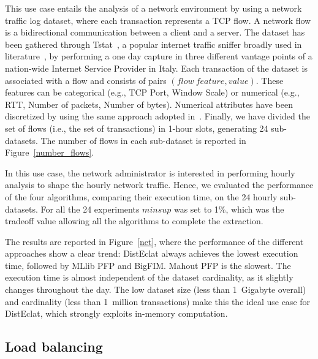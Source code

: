 This use case entails the analysis of a network environment by
using a network traffic log dataset, where each transaction represents a TCP flow.
A network flow is a bidirectional communication between a client and a server.
The dataset has been gathered through Tstat~\cite{Tstat,Tstat2}, a popular
internet traffic sniffer broadly used in
literature~\cite{giordano2015youlighter,ApilettiBCCG13},
by performing a one day capture in three different vantage points
of a nation-wide Internet Service Provider in Italy.
Each transaction of the dataset is associated with
a flow and consists of pairs $(flow~feature, value)$. These features can be
categorical (e.g., TCP Port, Window Scale) or numerical (e.g., RTT,
Number of packets, Number of bytes). Numerical attributes have been discretized by using the same
approach adopted in~\cite{ApilettiBCCG13}.
Finally, we have divided the set of flows (i.e., the set of transactions)
in 1-hour slots, generating 24 sub-datasets.
The number of flows in each sub-dataset
is reported in Figure~\ref{number_flows}.

In this use case, the network administrator is interested in performing hourly
analysis to shape the hourly network traffic.
Hence, we evaluated the performance of the four algorithms,
comparing their execution time, on the 24 hourly sub-datasets.
For all the 24 experiments $minsup$ was set to 1\%, which was
the tradeoff value allowing all the algorithms to complete the extraction.

The results are reported in Figure~\ref{net}, where the performance of the
different approaches show a clear trend: DistEclat always achieves the
lowest execution time, followed by MLlib PFP and BigFIM.
Mahout PFP is the slowest.
The execution time is almost independent of the dataset cardinality,
as it slightly changes throughout the day.
The low dataset size (less than 1~Gigabyte overall)
and cardinality (less than 1~million transactions) make this the ideal
use case for DistEclat, which strongly exploits in-memory computation.



\subsection{Load balancing}
\label{load_exp}


